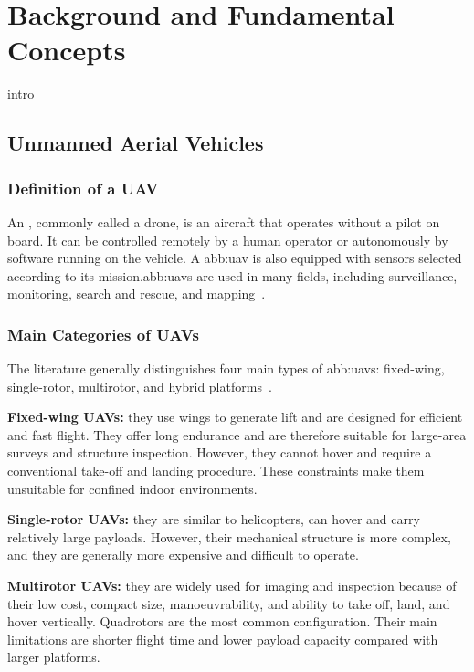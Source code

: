 \chapter{Background and Fundamental Concepts}%
\label{chap:background}

{intro}

\section{Unmanned Aerial Vehicles}%
\label{sec:bg:uav}

\subsection{Definition of a UAV}%
\label{subsec:bg:uav-definition}

An , commonly called a drone, is an aircraft that operates
without a pilot on board. It can be controlled remotely by a human operator or
autonomously by software running on the vehicle. A \gls{abb:uav} is also equipped
with sensors selected according to its mission.\Glspl{abb:uav} are used in many fields, including surveillance, monitoring, search and rescue, and mapping~\cite{kumar2025comprehensive}. 


\subsection{Main Categories of UAVs}%
\label{subsec:bg:uav-categories}

The literature generally distinguishes four main types of \glspl{abb:uav}:
fixed-wing, single-rotor, multirotor, and hybrid
platforms~\cite{mohsan2023unmanned}.

\textbf{Fixed-wing UAVs:} they use wings to generate lift and are designed for
efficient and fast flight. They offer long endurance and are therefore suitable
for large-area surveys and structure inspection.
However, they cannot hover and require a conventional take-off and landing
procedure. These constraints make them unsuitable for
confined indoor environments.

\textbf{Single-rotor UAVs:} they are similar to helicopters, can hover and carry
relatively large payloads. However, their mechanical
structure is more complex, and they are generally more expensive and difficult to
operate.

\textbf{Multirotor UAVs:} they are widely used for imaging and inspection because of their low cost, compact size, manoeuvrability, and ability to take off, land, and hover vertically. Quadrotors are the most common
configuration. Their main limitations are shorter flight time and lower payload
capacity compared with larger platforms.

